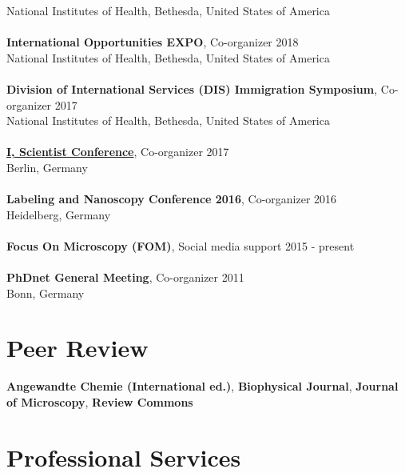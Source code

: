 \documentclass[margin,line]{res}
\begin{document}
\begin{resume}
National Institutes of Health, Bethesda, United States of America\\
\vspace*{-3mm}\\
{\bf International Opportunities EXPO}, Co-organizer \hfill {2018}\\
National Institutes of Health, Bethesda, United States of America\\
\vspace*{-3mm}\\
{\bf Division of International Services (DIS) Immigration Symposium}, Co-organizer  \hfill {2017}\\
National Institutes of Health, Bethesda, United States of America\\
\vspace*{-3mm}\\
{\bf \href{https://www.iscientist.berlin/}{I, Scientist Conference}},  Co-organizer \hfill {2017}\\
Berlin, Germany\\
\vspace*{-3mm}\\
{\bf Labeling and Nanoscopy Conference 2016}, Co-organizer \hfill {2016}\\
Heidelberg, Germany\\
\vspace*{-3mm}\\
{\bf Focus On Microscopy (FOM)}, Social media support \hfill {2015 - present}\\
\vspace*{-3mm}\\
{\bf PhDnet General Meeting}, Co-organizer \hfill {2011}\\
Bonn, Germany


\section{\sc Peer Review} 
{\bf Angewandte Chemie (International ed.)}, {\bf Biophysical Journal}, {\bf Journal of Microscopy}, {\bf Review Commons}


\section{\sc Professional Services}



\end{resume}
\end{document}
